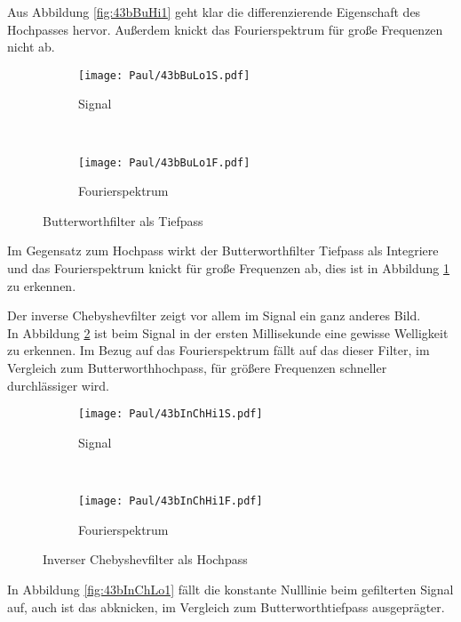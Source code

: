 Aus Abbildung \ref{fig:43bBuHi1} geht klar die differenzierende Eigenschaft des Hochpasses hervor. Außerdem knickt das Fourierspektrum für große Frequenzen nicht ab.\\

\begin{figure}[h]
    \centering
    \begin{subfigure}{0.9\textwidth}
        \centering
        \texttt{[image: Paul/43bBuLo1S.pdf]}
        \caption{Signal}
    \end{subfigure}
    \\
    \begin{subfigure}{0.9\textwidth}
        \centering
        \texttt{[image: Paul/43bBuLo1F.pdf]}
        \caption{Fourierspektrum}
    \end{subfigure}
    \caption{Butterworthfilter als Tiefpass}
    \label{fig:43BuLo1}
\end{figure}

Im Gegensatz zum Hochpass wirkt der Butterworthfilter Tiefpass als Integriere und das Fourierspektrum knickt für große Frequenzen ab, dies ist in Abbildung \ref{fig:43BuLo1} zu erkennen.


\newpage
Der inverse Chebyshevfilter zeigt vor allem im Signal ein ganz anderes Bild.\\
In Abbildung \ref{fig:43bInChHi1} ist beim Signal in der ersten Millisekunde eine gewisse Welligkeit zu erkennen. Im Bezug auf das Fourierspektrum fällt auf das dieser Filter, im Vergleich zum Butterworthhochpass, für größere Frequenzen schneller durchlässiger wird.
\begin{figure}[h]
    \centering
    \begin{subfigure}{0.9\textwidth}
        \centering
        \texttt{[image: Paul/43bInChHi1S.pdf]}
        \caption{Signal}
    \end{subfigure}
    \\
    \begin{subfigure}{0.9\textwidth}
        \centering
        \texttt{[image: Paul/43bInChHi1F.pdf]}
        \caption{Fourierspektrum}
    \end{subfigure}
    \caption{Inverser Chebyshevfilter als Hochpass}
    \label{fig:43bInChHi1}
\end{figure}

\newpage
In Abbildung \ref{fig:43bInChLo1} fällt die konstante Nulllinie beim gefilterten Signal auf, auch ist das abknicken, im Vergleich zum Butterworthtiefpass ausgeprägter.\\


